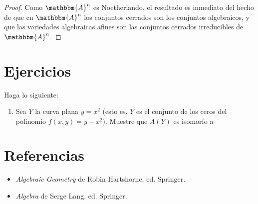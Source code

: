\documentclass[12pt]{report}
\theoremstyle{largebreak}
\newcommand{\bbm}[1]{\ensuremath{\mathbbm{#1}}}
\begin{document}
    \begin{proof}
        Como $\bbm{A}^n$ es Noetheriando, el resultado es inmediato del hecho de que en $\bbm{A}^n$ los conjuntos cerrados son los conjuntos algebraicos, y que las variedades algebraicas afines son las conjuntos cerrados irreducibles de $\bbm{A}^n$.
    \end{proof}

    \begin{mydef}
        
    \end{mydef}

    \newpage

    \section{Ejercicios}

    \begin{excer}
        Haga lo siguiente:
        \begin{enumerate}[label=(\textit{\alph*})]
            \item Sea $Y$ la curva plana $y=x^2$ (esto es, $Y$ es el conjunto de los ceros del polinomio $f(x,y)=y-x^2$). Muestre que $A(Y)$ es isomorfo a 
        \end{enumerate}
    \end{excer}

    \newpage

    \section{Referencias}

    \begin{itemize}
        \item \textit{Algebraic Geometry} de Robin Hartshorne, ed. Springer.
        \item \textit{Algebra} de Serge Lang, ed. Springer.
    \end{itemize}
\end{document}
